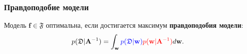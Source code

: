 \documentclass[11pt,pdf,utf8,russian,aspectratio=169]{beamer}
\begin{document}
\begin{frame}       
\begin{multicols}{2}
                                                                                                                            
\frametitle{Правдоподобие модели}                                                                                                         
                                                                                                                       
Модель $\mathbf{f} \in \mathfrak{F}$  оптимальна, если достигается максимум \textbf{правдоподобия модели}:                                      
\[                                                                                                                                              
        p(\mathfrak{D}|\mathbf{A}^{-1}) = \int_\mathbf{w} \textcolor{blue}{p( \mathfrak{D}| \mathbf{w})}\textcolor{red}{p(\mathbf{w}|\mathbf{A}^{-1})}d\mathbf{w}.                           
\]                                                                                                                                              
                                                                                                                                                

\end{multicols}
\end{frame}
\end{document}
